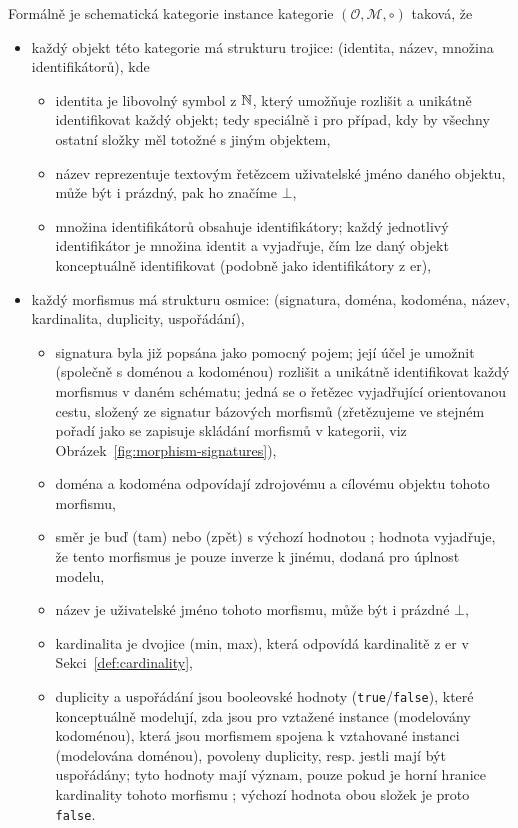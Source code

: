 Formálně je schematická kategorie instance kategorie $(\mathcal O, \mathcal M, \circ)$ taková, že
\begin{itemize}
  \item každý objekt této kategorie má strukturu trojice: (identita, název, množina identifikátorů), kde
        \begin{itemize}
          \item identita je libovolný symbol z $\mathbb{N}$, který umožňuje rozlišit a unikátně identifikovat každý objekt; tedy speciálně i pro případ, kdy by všechny ostatní složky měl totožné s jiným objektem,
          \item název reprezentuje textovým řetězcem uživatelské jméno daného objektu, může být i prázdný, pak ho značíme $\bot$,
          \item množina identifikátorů obsahuje identifikátory; každý jednotlivý identifikátor je množina identit a vyjadřuje, čím lze daný objekt konceptuálně identifikovat (podobně jako identifikátory z \acrshort{er}),
        \end{itemize}
  \item každý morfismus má strukturu osmice: (signatura, doména, kodoména, název, kardinalita, duplicity, uspořádání),
        \begin{itemize}
          \item signatura byla již popsána jako pomocný pojem; její účel je umožnit (společně s doménou a kodoménou) rozlišit a unikátně identifikovat každý morfismus v daném schématu; jedná se o řetězec vyjadřující orientovanou cestu, složený ze signatur bázových morfismů (zřetězujeme ve stejném pořadí jako se zapisuje skládání morfismů v kategorii, viz Obrázek~\ref{fig:morphism-signatures}),
          \item doména a kodoména odpovídají zdrojovému a cílovému objektu tohoto morfismu,
          \item směr je buď \zero{} (tam) nebo \one{} (zpět) s výchozí hodnotou \zero{}; hodnota \one{} vyjadřuje, že tento morfismus je pouze inverze k jinému, dodaná pro úplnost modelu,
          \item název je uživatelské jméno tohoto morfismu, může být i prázdné $\bot$,
          \item kardinalita je dvojice (min, max), která odpovídá kardinalitě z \acrshort{er} v Sekci~\ref{def:cardinality},
          \item duplicity a uspořádání jsou booleovské hodnoty (\texttt{true}/\texttt{false}), které konceptuálně modelují, zda jsou pro vztažené instance (modelovány kodoménou), která jsou morfismem spojena k vztahované instanci (modelována doménou), povoleny duplicity, resp. jestli mají být uspořádány; tyto hodnoty mají význam, pouze pokud je horní hranice kardinality tohoto morfismu \many; výchozí hodnota obou složek je proto \texttt{false}.
        \end{itemize}
\end{itemize}

